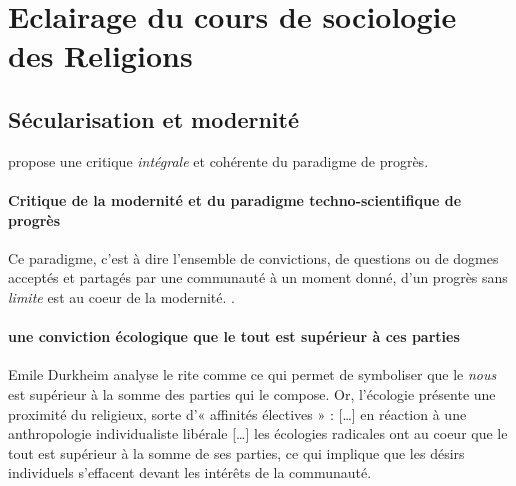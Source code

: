  


\section{Eclairage du cours de sociologie des Religions}

\subsection{Sécularisation et modernité}

\RLimite propose une critique \textit{intégrale} et cohérente du paradigme de progrès.

\paragraph{Critique de la modernité et du paradigme techno-scientifique de progrès} Ce paradigme, c'est à dire l'ensemble de convictions, de questions ou de dogmes acceptés 
et partagés par une communauté à un moment donné, d'un progrès sans \textit{limite} est  au coeur de la modernité. \cite{universalis_modernite_nodate}. 

 \paragraph{une conviction écologique que le tout est supérieur à ces parties} Emile Durkheim analyse le rite comme ce qui permet de symboliser que le \textit{nous} est supérieur à la somme des parties qui le compose. Or, l'écologie présente une proximité du religieux,  sorte d'« affinités électives » \cite{hervieu-leger_religion_1993} : 
 [\ldots] en réaction à une anthropologie individualiste libérale [\ldots] les écologies radicales ont au coeur que le tout est supérieur à la somme de ses parties, ce qui implique que les désirs individuels s’effacent devant les intérêts de la communauté. \cite[35]{carle_contre-revolutions_2017}
 




